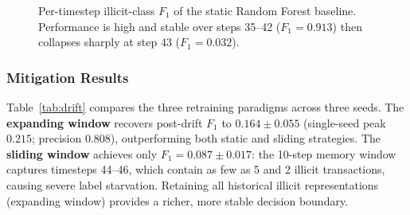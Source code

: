 \documentclass[conference]{IEEEtran}
\begin{document}
\begin{figure}[t]
\centering
{}
\caption{%
  Per-timestep illicit-class $F_1$ of the static Random Forest baseline.
  Performance is high and stable over steps 35--42 ($F_1 = 0.913$)
  then collapses sharply at step 43 ($F_1 = 0.032$).
}
\label{fig:drift}
\end{figure}

\subsubsection{Mitigation Results}

Table~\ref{tab:drift} compares the three retraining paradigms across
three seeds.
The \textbf{expanding window} recovers post-drift $F_1$ to
$0.164 \pm 0.055$ (single-seed peak $0.215$; precision $0.808$),
outperforming both static and sliding strategies.
The \textbf{sliding window} achieves only $F_1 = 0.087 \pm 0.017$:
the 10-step memory window captures timesteps 44--46, which contain as
few as 5 and 2 illicit transactions, causing severe label starvation.
Retaining all historical illicit representations (expanding window)
provides a richer, more stable decision boundary.
\end{document}
